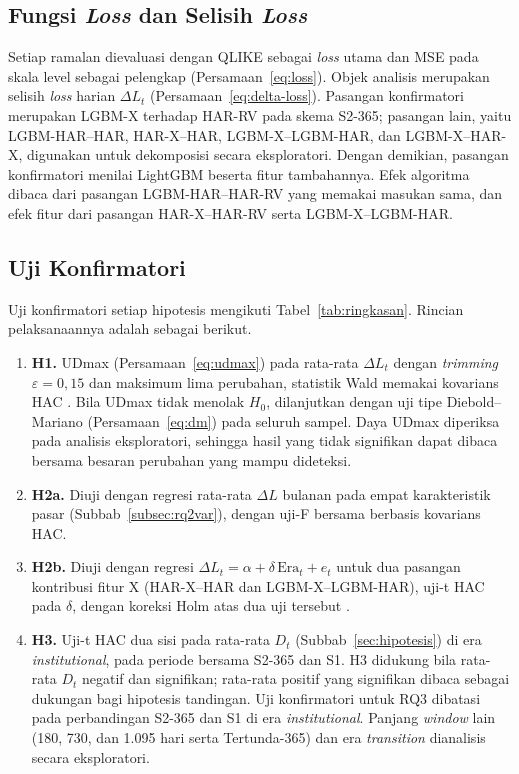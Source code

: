\subsection{Fungsi \textit{Loss} dan Selisih \textit{Loss}}
Setiap ramalan dievaluasi dengan QLIKE sebagai \textit{loss} utama dan MSE
pada skala level sebagai pelengkap (Persamaan~\eqref{eq:loss}). Objek analisis
merupakan selisih \textit{loss} harian $\Delta L_t$
(Persamaan~\eqref{eq:delta-loss}). Pasangan konfirmatori merupakan LGBM-X
terhadap HAR-RV pada skema S2-365; pasangan lain, yaitu LGBM-HAR--HAR,
HAR-X--HAR, LGBM-X--LGBM-HAR, dan LGBM-X--HAR-X, digunakan untuk dekomposisi
secara eksploratori. Dengan demikian, pasangan konfirmatori menilai LightGBM
beserta fitur tambahannya. Efek algoritma dibaca dari pasangan
LGBM-HAR--HAR-RV yang memakai masukan sama, dan efek fitur dari pasangan
HAR-X--HAR-RV serta LGBM-X--LGBM-HAR.

\subsection{Uji Konfirmatori}
Uji konfirmatori setiap hipotesis mengikuti Tabel~\ref{tab:ringkasan}.
Rincian pelaksanaannya adalah sebagai berikut.
\begin{enumerate}
  \item \textbf{H1.} UDmax (Persamaan~\eqref{eq:udmax}) pada rata-rata
        $\Delta L_t$ dengan \textit{trimming} $\varepsilon = 0{,}15$ dan
        maksimum lima perubahan, statistik Wald memakai kovarians HAC
        \cite{bai1998,bai2003,martins2016}. Bila UDmax tidak menolak $H_0$,
        dilanjutkan dengan uji tipe Diebold--Mariano
        (Persamaan~\eqref{eq:dm}) pada seluruh sampel. Daya UDmax diperiksa pada
        analisis eksploratori, sehingga hasil yang tidak signifikan dapat
        dibaca bersama besaran perubahan yang mampu dideteksi.
  \item \textbf{H2a.} Diuji dengan regresi rata-rata $\Delta L$ bulanan
        pada empat karakteristik pasar (Subbab~\ref{subsec:rq2var}), dengan
        uji-F bersama berbasis kovarians HAC.
  \item \textbf{H2b.} Diuji dengan regresi
        $\Delta L_t = \alpha + \delta\,\text{Era}_t + e_t$ untuk dua
        pasangan kontribusi fitur X (HAR-X--HAR dan LGBM-X--LGBM-HAR), uji-t
        HAC pada $\delta$, dengan koreksi Holm atas dua uji tersebut
        \cite{holm1979}.
  \item \textbf{H3.} Uji-t HAC dua sisi pada rata-rata $D_t$ (Subbab~\ref{sec:hipotesis}) di
        era \textit{institutional}, pada periode bersama S2-365 dan S1. H3
        didukung bila rata-rata $D_t$ negatif dan signifikan; rata-rata
        positif yang signifikan dibaca sebagai dukungan bagi hipotesis
        tandingan. Uji konfirmatori untuk RQ3 dibatasi pada perbandingan
        S2-365 dan S1 di era \textit{institutional}. Panjang \textit{window}
        lain (180, 730, dan 1.095 hari serta Tertunda-365) dan era
        \textit{transition} dianalisis secara eksploratori.
\end{enumerate}

